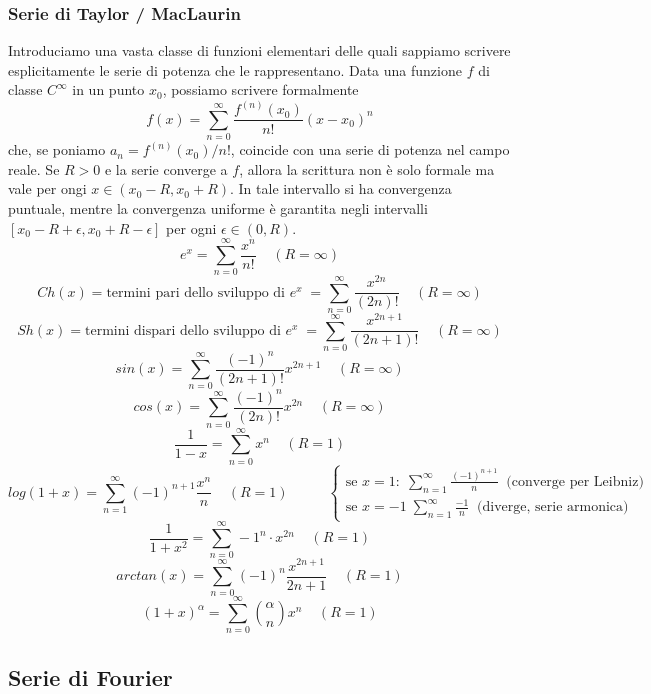 \subsubsection{Serie di Taylor / MacLaurin}
Introduciamo una vasta classe di funzioni elementari delle quali sappiamo scrivere esplicitamente le serie di potenza che le rappresentano.\newline
Data una funzione $f$ di classe $C^\infty$ in un punto $x_0$, possiamo scrivere formalmente
\[
    f(x) = \sum_{n=0}^{\infty} \frac{f^{(n)}(x_0)}{n!}(x-x_0)^n
\]
che, se poniamo $a_n = f^{(n)}(x_0)/n!$, coincide con una serie di potenza nel campo reale. Se $R > 0$ e la serie converge a $f$, allora la scrittura non è solo formale ma vale per ongi $x \in (x_0 - R, x_0 + R)$. In tale intervallo si ha convergenza puntuale, mentre la convergenza uniforme è garantita negli intervalli $[x_0 - R + \epsilon, x_0 + R -\epsilon]$ per ogni $\epsilon \in (0,R)$.
\[
    e^x = \sum_{n=0}^{\infty} \frac{x^n}{n!} \;\;\;\; (R= \infty)
\]
\[
    Ch(x) = \text{termini pari dello sviluppo di $e^x$}\;= \sum_{n=0}^{\infty} \frac{x^{2n}}{(2n)!} \;\;\;\; (R= \infty)
\]
\[
    Sh(x) = \text{termini dispari dello sviluppo di $e^x$}\;=  \sum_{n=0}^{\infty} \frac{x^{2n+1}}{(2n+1)!} \;\;\;\; (R= \infty)
\]
\[
    sin(x) = \sum_{n=0}^{\infty} \frac{(-1)^n}{(2n+1)!} x^{2n+1}\;\;\;\; (R= \infty)
\]
\[
    cos(x) = \sum_{n=0}^{\infty} \frac{(-1)^n}{(2n)!}x^{2n}\;\;\;\; (R= \infty)
\]
\[
    \frac{1}{1-x} = \sum_{n=0}^{\infty} x^n\;\;\;\; (R= 1)
\]
\[
    log(1+x) = \sum_{n=1}^{\infty} (-1)^{n+1} \frac{x^n}{n}\;\;\;\; (R= 1)\;\;\;\;\;\;\;\;\;\;\begin{cases}
        \text{se $x=1: $}\; \sum_{n=1}^{\infty}\frac{(-1)^{n+1}}{n} \;\;\text{(converge per Leibniz)}\;\\
        \text{se $x=-1$}\; \sum_{n=1}^{\infty}\frac{-1}{n} \;\;\text{(diverge, serie armonica)}\;
    \end{cases}
\]
\[
    \frac{1}{1+x^2} = \sum_{n=0}^{\infty} -1^n \cdot x^{2n} \;\;\;\;(R=1)
\]
\[
    arctan(x) = \sum_{n=0}^{\infty}(-1)^n \frac{x^{2n+1}}{2n+1} \;\;\;\;(R=1)
\]
\[
    (1+x)^\alpha = \sum_{n=0}^{\infty} \binom{\alpha}{n}x^n \;\;\;\; (R=1)
\]
\subsection{Serie di Fourier}
